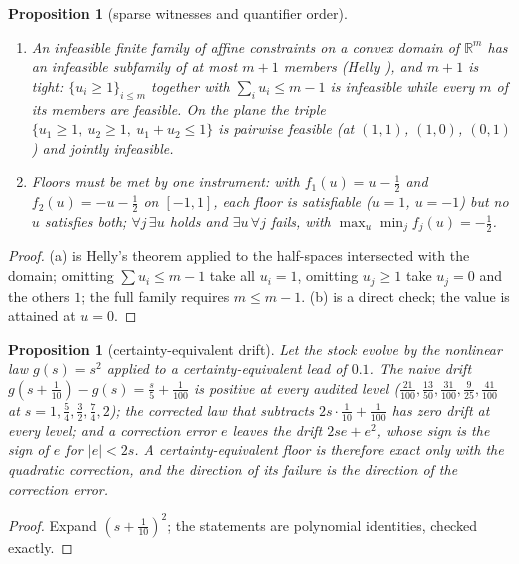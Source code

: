\documentclass[11pt,a4paper]{article}
\theoremstyle{plain}
\newtheorem{proposition}[theorem]{Proposition}
\theoremstyle{definition}
\theoremstyle{remark}
\newcommand{\R}{\mathbb{R}}
\newcommand{\tfr}[2]{\tfrac{#1}{#2}}
\begin{document}
\begin{proposition}[sparse witnesses and quantifier order]\label{prop:helly}
\begin{enumerate}[label=(\alph*),leftmargin=2em,itemsep=1pt]
\item An infeasible finite family of affine constraints on a convex domain of $\R^m$ has an infeasible subfamily of at most $m+1$ members (Helly \cite{Helly1923}), and $m+1$ is tight: $\{u_i\ge 1\}_{i\le m}$ together with $\sum_i u_i\le m-1$ is infeasible while every $m$ of its members are feasible. On the plane the triple $\{u_1\ge 1,\ u_2\ge 1,\ u_1+u_2\le 1\}$ is pairwise feasible (at $(1,1)$, $(1,0)$, $(0,1)$) and jointly infeasible.
\item Floors must be met by one instrument: with $f_1(u)=u-\tfr12$ and $f_2(u)=-u-\tfr12$ on $[-1,1]$, each floor is satisfiable ($u=1$, $u=-1$) but no $u$ satisfies both; $\forall j\,\exists u$ holds and $\exists u\,\forall j$ fails, with $\max_u\min_j f_j(u)=-\tfr12$.
\end{enumerate}
\end{proposition}

\begin{proof}
(a) is Helly's theorem applied to the half-spaces intersected with the domain; omitting $\sum u_i\le m-1$ take all $u_i=1$, omitting $u_j\ge 1$ take $u_j=0$ and the others $1$; the full family requires $m\le m-1$. (b) is a direct check; the value is attained at $u=0$.
\end{proof}

\begin{proposition}[certainty-equivalent drift]\label{prop:drift}
Let the stock evolve by the nonlinear law $g(s)=s^2$ applied to a certainty-equivalent lead of $0.1$. The naive drift $g(s+\tfr1{10})-g(s)=\tfrac{s}{5}+\tfrac1{100}$ is positive at every audited level ($\tfrac{21}{100},\tfrac{13}{50},\tfrac{31}{100},\tfrac{9}{25},\tfrac{41}{100}$ at $s=1,\tfr54,\tfr32,\tfr74,2$); the corrected law that subtracts $2s\cdot\tfr1{10}+\tfrac1{100}$ has zero drift at every level; and a correction error $e$ leaves the drift $2se+e^2$, whose sign is the sign of $e$ for $|e|<2s$. A certainty-equivalent floor is therefore exact only with the quadratic correction, and the direction of its failure is the direction of the correction error.
\end{proposition}

\begin{proof}
Expand $(s+\tfr1{10})^2$; the statements are polynomial identities, checked exactly.
\end{proof}
\end{document}
